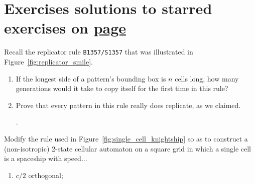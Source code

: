\section*{Exercises \hfill \normalfont\textsf{\small solutions to starred exercises on \hyperlink{solutions_0e0p}{page \pageref{solutions_0e0p}}}}
\label{sec:solutions_0e0p}
\vspace*{-0.4cm}\hrulefill\vspace*{-0.3cm}\footnotesize\begin{multicols}{2}\vspace*{-0.4cm}\raggedcolumns{}
	\setlength{\parskip}{0pt}
	
	
	\begin{problem}\label{exer:replicator_rule_really_replicates}
		Recall the replicator rule \texttt{B1357/S1357} that was illustrated in Figure~\ref{fig:replicator_smile}.\smallskip
		
		\begin{enumerate}[label=\bf\color{ocre}(\alph*)]
			\item {} If the longest side of a pattern's bounding box is $n$ cells long, how many generations would it take to copy itself for the first time in this rule?
			
			\item {} Prove that every pattern in this rule really does replicate, as we claimed.
			
			.
		\end{enumerate}
	\end{problem}


	\mfilbreak
	
	
	\begin{problem}\label{exer:0e0p_single_cell_spaceships}
		Modify the rule used in Figure~\ref{fig:single_cell_knightship} so as to construct a (non-isotropic) 2-state cellular automaton on a square grid in which a single cell is a spaceship with speed...\smallskip
		
		\begin{enumerate}[label=\bf\color{ocre}(\alph*)]
			\item {} $c/2$ orthogonal;
			

\end{enumerate}
\end{problem}
\end{multicols}
